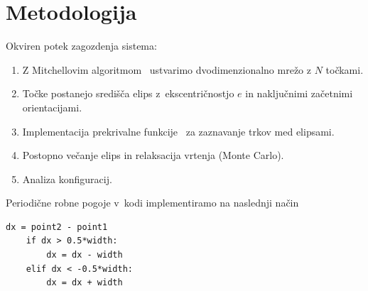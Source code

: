 \lstset{language=Python}

\chapter{Metodologija}
\label{chMe}
Okviren potek zagozdenja sistema:
\begin{enumerate}
\item Z Mitchellovim algoritmom~\cite{mitch} ustvarimo dvodimenzionalno mrežo z $N$ 
    točkami.
\item Točke postanejo središča elips z~ekscentričnostjo $e$ in naključnimi začetnimi 
    orientacijami.
\item Implementacija prekrivalne funkcije~\cite{perram1985} za zaznavanje trkov med 
    elipsami.
\item Postopno večanje elips in relaksacija vrtenja (Monte Carlo).
\item Analiza konfiguracij.
\end{enumerate}
Periodične robne pogoje v~kodi implementiramo na naslednji način
\begin{lstlisting}[frame=single]  
    dx = point2 - point1
    if dx > 0.5*width:
        dx = dx - width
    elif dx < -0.5*width:
        dx = dx + width
\end{lstlisting}

